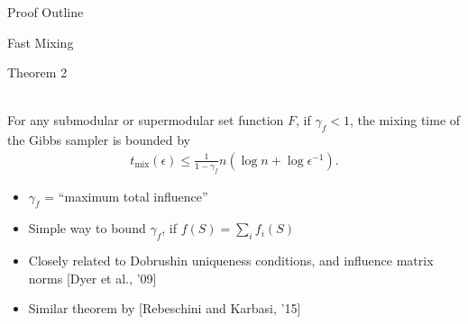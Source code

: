 \documentclass[mathserif]{beamer}
\newcommand{\qcite}[1]{{\scriptsize\color{col2}[#1]}}
\newcommand{\qtheorem}[2]{%
\begin{tcolorbox}[enhanced jigsaw,size=tight,boxsep=7pt,boxrule=0.7pt,coltext=textcolor,colframe=col2,colback=col1,opacityback=0,opacityframe=1]
\begin{minipage}{\textwidth}
{\color{col2}\strut Theorem #1}\\[0.7em]
#2
\end{minipage}
\end{tcolorbox}%
}
\begin{document}
\begin{frame}{Proof Outline}
%
\end{frame}

\begin{frame}{Fast Mixing}
\vspace{0.5em}
\qtheorem{2}{
For any submodular or supermodular set function $F$, if $\gamma_f < 1$, the mixing time of the Gibbs sampler is bounded by
\vspace{-0.5em}
\begin{align*}
t_{\textrm{mix}}(\epsilon) \leq \frac{1}{1 - \gamma_f} n \left(\log n + \log\epsilon^{-1}\right).
\end{align*}
}

\vspace{0.5em}
\begin{itemize}
\item<1-> $\gamma_f$ = ``maximum total influence''
\vspace{0.5em}
\item<2-> Simple way to bound $\gamma_f$, if $f(S) = \sum_i f_i(S)$
\vspace{0.5em}
\item<3-> Closely related to Dobrushin uniqueness conditions, and influence matrix norms \qcite{Dyer et al., '09}
\vspace{0.5em}
\item<4-> Similar theorem by \qcite{Rebeschini and Karbasi, '15}
\end{itemize}
\end{frame}
\end{document}
